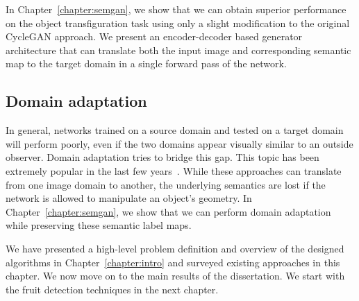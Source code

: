 In Chapter~\ref{chapter:semgan}, we show that we can obtain superior performance on the object transfiguration task using only a slight modification to the original CycleGAN approach. We present an encoder-decoder based generator architecture that can translate both the input image and corresponding semantic map to the target domain in a single forward pass of the network.

\subsection{Domain adaptation}
In general, networks trained on a source domain and tested on a target domain will perform poorly, even if the two domains appear visually similar to an outside observer. Domain adaptation tries to bridge this gap. This topic has been extremely popular in the last few years~\cite{hoffman_cycada:_2017, murez_image_2017, hong_conditional_2018, zhang_collaborative_2018, shen_wasserstein_2017, hassan_unsupervised_2018, long_conditional_2018, hosseini-asl_augmented_2019}. While these approaches can translate from one image domain to another, the underlying semantics are lost if the network is allowed to manipulate an object's geometry. In Chapter~\ref{chapter:semgan}, we show that we can perform domain adaptation while preserving these semantic label maps.


We have presented a high-level problem definition and overview of the designed algorithms in Chapter~\ref{chapter:intro} and surveyed existing approaches in this chapter. We now move on to the main results of the dissertation. We start with the fruit detection techniques in the next chapter.